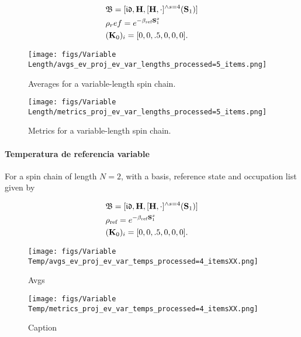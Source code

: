 \documentclass{homework}
\begin{document}
\begin{align}
    &\mathfrak{B} = [\mathfrak{i}\mathfrak{d}, {\bf H}, [{\bf H}, \cdot]^{\land s=4}({\bf S}_1)] \\
    & \rho_ref = e^{-\beta_{\textnormal{ref}} {\bf S}_1^x}\\
    & ({\bf K}_0)_i = [0, 0, .5, 0,0,0].
\end{align}    

\begin{figure}[H]
        \centering
        \texttt{[image: figs/Variable Length/avgs\_ev\_proj\_ev\_var\_lengths\_processed=5\_items.png]}
    \caption{Averages for a variable-length spin chain.}
    \label{fig:Feynmann_diags_first_order_GF}
    \end{figure}

\begin{figure}[H]
    \centering
    \texttt{[image: figs/Variable Length/metrics\_proj\_ev\_var\_lengths\_processed=5\_items.png]}\caption{Metrics for a variable-length spin chain.}
    \label{fig:my_label}
\end{figure}

\paragraph{Temperatura de referencia variable}


For a spin chain of length $N = 2$, with a basis, reference state and occupation list given by

\begin{align}
    &\mathfrak{B} = [\mathfrak{i}\mathfrak{d}, {\bf H}, [{\bf H}, \cdot]^{\land s=4}({\bf S}_1)] \\
    & \rho_{\textnormal{ref}} = e^{-\beta_{\textnormal{ref}} {\bf S}_1^x}\\
    & ({\bf K}_0)_i = [0, 0, .5, 0,0,0].
\end{align}    

\begin{figure}[H]
    \centering
    \texttt{[image: figs/Variable Temp/avgs\_ev\_proj\_ev\_var\_temps\_processed=4\_itemsXX.png]}
    \caption{Avgs}
    \label{fig:my_label}
\end{figure}

\begin{figure}[H]
    \centering
    \texttt{[image: figs/Variable Temp/metrics\_proj\_ev\_var\_temps\_processed=4\_itemsXX.png]}
    \caption{Caption}
    \label{fig:my_label}
\end{figure}
\end{document}
